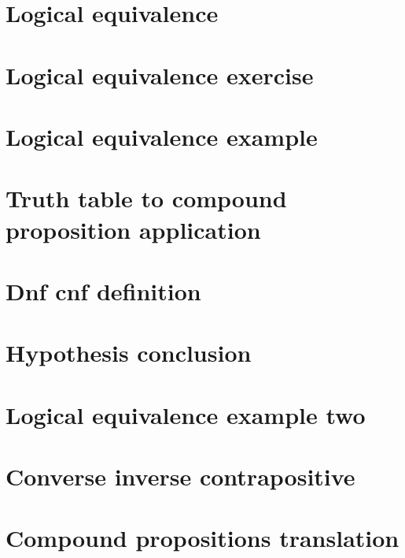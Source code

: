 \section*{Logical equivalence}

\vfill
\section*{Logical equivalence exercise}

\vfill
\section*{Logical equivalence example}

\vfill
\section*{Truth table to compound proposition application}

\vfill
\section*{Dnf cnf definition}

\vfill
\section*{Hypothesis conclusion}

\vfill
\section*{Logical equivalence example two}

\vfill
\section*{Converse inverse contrapositive}

\vfill
\section*{Compound propositions translation}

\vfill
